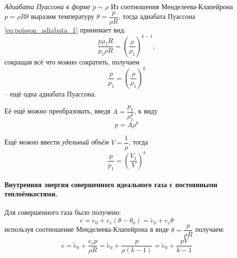 \textit{Адиабата Пуассона в форме $p \sim \rho$}
Из соотношения Менделеева-Клапейрона $p = \rho R \theta$ выразим температуру $\theta = \dfrac{p}{\rho R}$, тогда адиабата Пуассона \eqref{eq:poisson_adiabata_1} принимает вид:
\[
  \dfrac{p \rho_1 R}{p_1 \rho R} = \left(\dfrac{\rho}{\rho_1} \right)^{k-1},
\]
сокращая всё что можно сократить, получаем
\begin{equation}\label{eq:poisson_adiabata_2}
  \dfrac{p}{p_1} = \left( \dfrac{\rho}{\rho_1} \right)^{k}
\end{equation}
-- ещё одна адиабата Пуассона.

Её ещё можно преобразовать, введя $A = \dfrac{p_1}{\rho_1^k}$, к виду
\begin{equation}\label{eq:poisson_adiabata_3}
  p = A \rho^k
\end{equation}

Ещё можно ввести \emph{удельный объём} $V = \dfrac{1}{\rho}$, тогда
\begin{equation}\label{eq:poisson_adiabata_4}
  \dfrac{p}{p_1} = \left( \dfrac{V_1}{V} \right)^{k}
\end{equation}

\paragraph{Внутренняя энергия совершенного идеального газа с постоянными теплоёмкостями.}
Для совершенного газа было получено:
\[
  e = e_0 + c_v(\theta - \theta_0) = \tilde e_0 + c_v \theta
\]
используя соотношение Менделеева-Клапейрона в виде $\theta = \dfrac{p}{\rho R}$ получаем:
\[
  e = \tilde e_0 + \dfrac{c_v p}{\rho R} = \tilde e_0 + \dfrac{p}{\rho (k-1)} =
  \tilde e_0 + \dfrac{pV}{k-1}
\]
